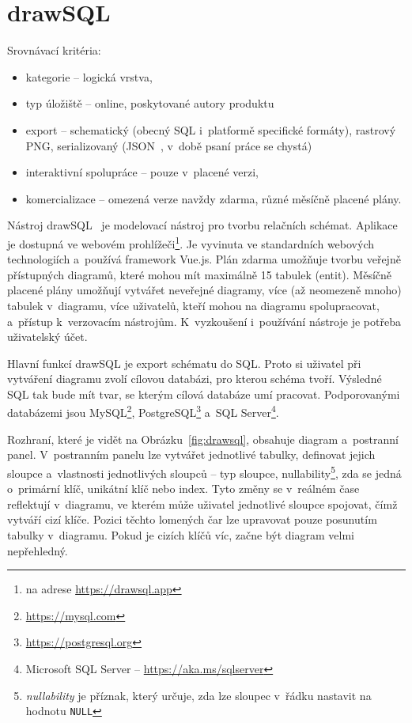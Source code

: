 \section{drawSQL}

Srovnávací kritéria:
\begin{itemize}
  \item kategorie -- logická vrstva,
  \item typ úložiště -- online, poskytované autory produktu
  \item export -- schematický (obecný SQL i~platformě specifické formáty), rastrový PNG, serializovaný (JSON~\cite{tc39group_jsondata_2017}, v~době psaní práce se chystá)
  \item interaktivní spolupráce -- pouze v~placené verzi,
  \item komercializace -- omezená verze navždy zdarma, různé měsíčně placené plány.
\end{itemize}

Nástroj drawSQL~\cite{drawsql_2021} je modelovací nástroj pro tvorbu relačních schémat.
Aplikace je dostupná ve webovém prohlížeči\footnote{na adrese \url{https://drawsql.app}}.
Je vyvinuta ve standardních webových technologiích a~používá framework Vue.js.
Plán zdarma umožňuje tvorbu veřejně přístupných diagramů, které mohou mít maximálně 15 tabulek (entit).
Měsíčně placené plány umožňují vytvářet neveřejné diagramy, více (až neomezeně mnoho) tabulek v~diagramu, více uživatelů, kteří mohou na diagramu spolupracovat, a~přístup k~verzovacím nástrojům.
K~vyzkoušení i~používání nástroje je potřeba uživatelský účet.

Hlavní funkcí drawSQL je export schématu do SQL.
Proto si uživatel při vytváření diagramu zvolí cílovou databázi, pro kterou schéma tvoří.
Výsledné SQL tak bude mít tvar, se kterým cílová databáze umí pracovat.
Podporovanými databázemi jsou
MySQL\footnote{\url{https://mysql.com}},
PostgreSQL\footnote{\url{https://postgresql.org}}
a~SQL Server\footnote{Microsoft SQL Server -- \url{https://aka.ms/sqlserver}}.

Rozhraní, které je vidět na Obrázku~\ref{fig:drawsql}, obsahuje diagram a~postranní panel.
V~postranním panelu lze vytvářet jednotlivé tabulky, definovat jejich sloupce a~vlastnosti jednotlivých sloupců -- typ sloupce,
nullability\footnote{\emph{nullability} je příznak, který určuje, zda lze sloupec v~řádku nastavit na hodnotu \texttt{NULL}},
zda se jedná o~primární klíč, unikátní klíč nebo index.
Tyto změny se v~reálném čase reflektují v~diagramu, ve kterém může uživatel jednotlivé sloupce spojovat, čímž vytváří cizí klíče.
Pozici těchto lomených čar lze upravovat pouze posunutím tabulky v~diagramu.
Pokud je cizích klíčů víc, začne být diagram velmi nepřehledný.

